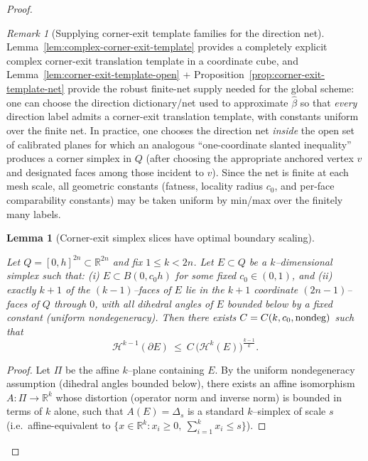 \documentclass[11pt]{article}
\numberwithin{equation}{section}  %
\theoremstyle{plain}
\newtheorem{lemma}[theorem]{Lemma}
\theoremstyle{definition}
\theoremstyle{remark}
\newtheorem{remark}[theorem]{Remark}
\newcommand{\R}{\mathbb{R}}
\begin{document}
\begin{proof}
\begin{remark}[Supplying corner-exit template families for the direction net]
\smallskip\noindent
Lemma~\ref{lem:complex-corner-exit-template} provides a completely explicit complex corner-exit translation template in a coordinate cube, and
Lemma~\ref{lem:corner-exit-template-open} + Proposition~\ref{prop:corner-exit-template-net} provide the robust finite-net supply needed for the global scheme:
one can choose the direction dictionary/net used to approximate $\widehat\beta$ so that \emph{every} direction label admits a corner-exit translation template, with
constants uniform over the finite net.
In practice, one chooses the direction net \emph{inside} the open set of calibrated planes for which an analogous ``one-coordinate slanted inequality''
produces a corner simplex in $Q$ (after choosing the appropriate anchored vertex $v$ and designated faces among those incident to $v$).
Since the net is finite at each mesh scale, all geometric constants (fatness, locality radius $c_0$, and per-face comparability constants) may be taken uniform by
min/max over the finitely many labels.
\end{remark}

\begin{lemma}[Corner-exit simplex slices have optimal boundary scaling]\label{lem:cube-vertex-slice-boundary}

Let $Q=[0,h]^{2n}\subset\R^{2n}$ and fix $1\le k<2n$.
Let $E\subset Q$ be a $k$--dimensional simplex such that:
(i) $E\subset B(0,c_0h)$ for some fixed $c_0\in(0,1)$, and
(ii) exactly $k\!+\!1$ of the $(k\!-\!1)$--faces of $E$ lie in the $k\!+\!1$ coordinate $(2n\!-\!1)$--faces of $Q$ through $0$,
with all dihedral angles of $E$ bounded below by a fixed constant (uniform nondegeneracy).
Then there exists $C=C(k,c_0,\textnormal{nondeg})$ such that
\[
\mathcal H^{k-1}(\partial E)\ \le\ C\,\bigl(\mathcal H^{k}(E)\bigr)^{\frac{k-1}{k}}.
\]

\end{lemma}


\begin{proof}
Let $\Pi$ be the affine $k$--plane containing $E$.  By the uniform nondegeneracy assumption (dihedral angles bounded below),
there exists an affine isomorphism $A:\Pi\to\R^k$ whose distortion (operator norm and inverse norm) is bounded in terms of $k$ alone, such that
$A(E)=\Delta_s$ is a standard $k$--simplex of scale $s$ (i.e.\ affine-equivalent to $\{x\in\R^k: x_i\ge 0,\ \sum_{i=1}^k x_i\le s\}$).


\end{proof}
\end{proof}
\end{document}
